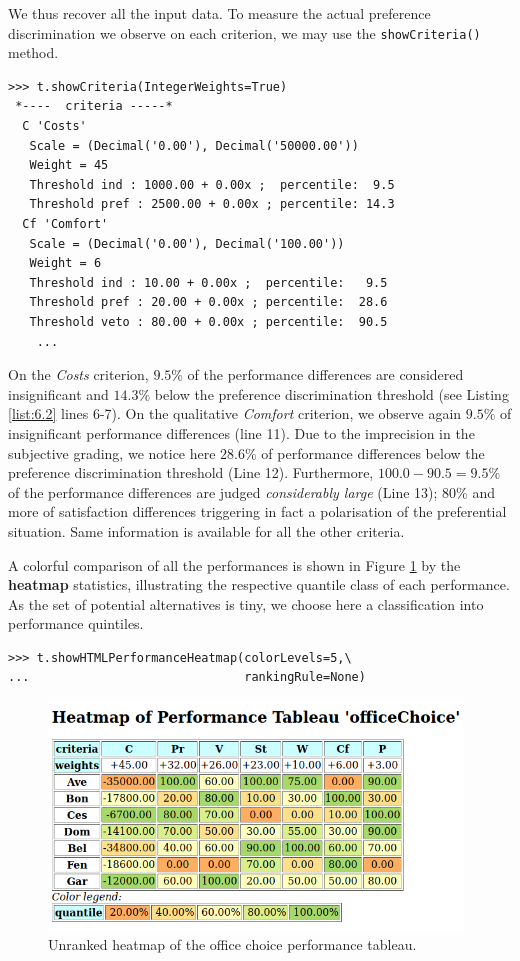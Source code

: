 We thus recover all the input data. To measure the actual preference discrimination we observe on each criterion, we may use the \texttt{showCriteria()} method.

\begin{lstlisting}[caption={Inspecting the performance criteria},label=list:6.2]
>>> t.showCriteria(IntegerWeights=True)
 *----  criteria -----*
  C 'Costs'
   Scale = (Decimal('0.00'), Decimal('50000.00'))
   Weight = 45
   Threshold ind : 1000.00 + 0.00x ;  percentile:  9.5
   Threshold pref : 2500.00 + 0.00x ; percentile: 14.3
  Cf 'Comfort'
   Scale = (Decimal('0.00'), Decimal('100.00'))
   Weight = 6
   Threshold ind : 10.00 + 0.00x ;  percentile:   9.5
   Threshold pref : 20.00 + 0.00x ; percentile:  28.6
   Threshold veto : 80.00 + 0.00x ; percentile:  90.5
    ...
\end{lstlisting}

On the \emph{Costs} criterion, $9.5\%$ of the performance differences are considered insignificant and $14.3\%$ below the preference discrimination threshold (see Listing \ref{list:6.2} lines 6-7). On the qualitative \emph{Comfort} criterion, we observe again $9.5\%$ of insignificant performance differences (line 11). Due to the imprecision in the subjective grading, we notice here $28.6\%$ of performance differences below the preference discrimination threshold (Line 12). Furthermore, $100.0 - 90.5 = 9.5\%$ of the performance differences are judged \emph{considerably large} (Line 13); $80\%$ and more of satisfaction differences triggering in fact a polarisation of the preferential situation. Same information is available for all the other criteria. 
 
A colorful comparison of all the performances is shown in Figure \ref{fig:6.1} by the \textbf{heatmap} statistics, illustrating the respective quantile class of each performance. As the set of potential alternatives is tiny, we choose here a classification into performance quintiles.

\begin{lstlisting}
>>> t.showHTMLPerformanceHeatmap(colorLevels=5,\
...                              rankingRule=None)
\end{lstlisting}
    
\begin{figure}[h]
\includegraphics[width=11cm]{Figures/officeChoiceHeatmap.png}
\caption{Unranked heatmap of the office choice performance tableau.}
\label{fig:6.1}       %
\end{figure}

